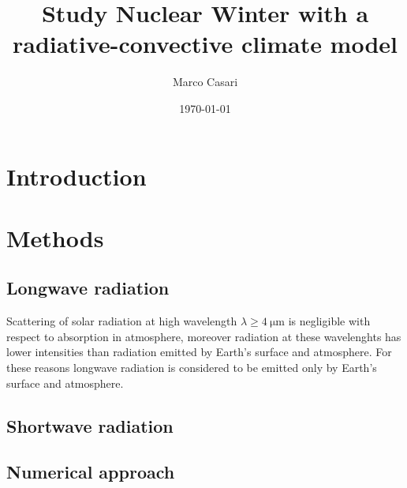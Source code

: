 \documentclass[a4paper,10pt,draft]{article}
\begin{document}
\title{Study Nuclear Winter with a radiative-convective climate model} %
\author{Marco Casari}
\date{\today}
\maketitle

\begin{abstract}
\end{abstract}


\section{Introduction}


\section{Methods}

\subsection{Longwave radiation}
Scattering of solar radiation at high wavelength $\lambda \geq \SI{4}{\micro\metre}$ is negligible with respect to absorption in atmosphere, moreover radiation at these wavelenghts has lower intensities than radiation emitted by Earth's surface and atmosphere. For these reasons longwave radiation is considered to be emitted only by Earth's surface and atmosphere.\cite[468]{https://doi.org/10.1029/RG016i004p00465}

\subsection{Shortwave radiation}

\subsection{Numerical approach} %
\end{document}
